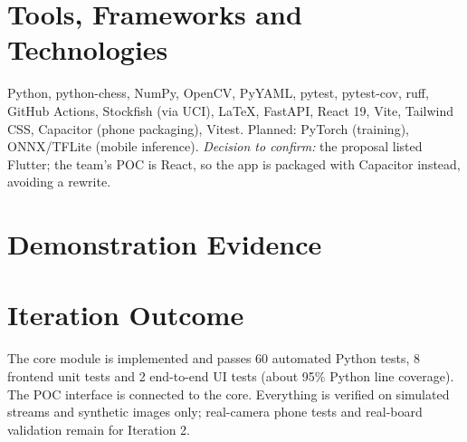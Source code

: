\section{Tools, Frameworks and Technologies}
Python, python-chess, NumPy, OpenCV, PyYAML, pytest, pytest-cov, ruff, GitHub Actions, Stockfish (via UCI),
LaTeX, FastAPI, React 19, Vite, Tailwind CSS, Capacitor (phone packaging), Vitest. Planned: PyTorch (training), ONNX/TFLite
(mobile inference). \emph{Decision to confirm:} the proposal listed Flutter; the team's POC is React, so the app is packaged
with Capacitor instead, avoiding a rewrite.

\section{Demonstration Evidence}

\section{Iteration Outcome}
The core module is implemented and passes 60 automated Python tests, 8 frontend unit tests and 2 end-to-end UI tests (about 95\% Python line coverage). The
POC interface is connected to the core. Everything is verified on simulated streams and synthetic images only; real-camera
phone tests and real-board validation remain for Iteration 2.
